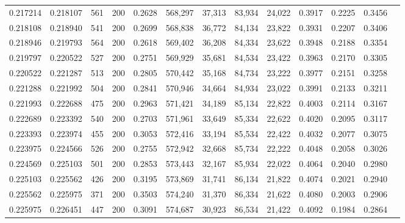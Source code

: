 \begin{tabular}{rrrrrrrrrrrrr}
0.217214 & 0.218107 &    561 & 200 &                                     0.2628 & 568,297 &  37,313 &  83,934 &  24,022 & 0.3917 & 0.2225 & 0.3456 \\
0.218108 & 0.218940 &    541 & 200 &                                     0.2699 & 568,838 &  36,772 &  84,134 &  23,822 & 0.3931 & 0.2207 & 0.3406 \\
0.218946 & 0.219793 &    564 & 200 &                                     0.2618 & 569,402 &  36,208 &  84,334 &  23,622 & 0.3948 & 0.2188 & 0.3354 \\
0.219797 & 0.220522 &    527 & 200 &                                     0.2751 & 569,929 &  35,681 &  84,534 &  23,422 & 0.3963 & 0.2170 & 0.3305 \\
0.220522 & 0.221287 &    513 & 200 &                                     0.2805 & 570,442 &  35,168 &  84,734 &  23,222 & 0.3977 & 0.2151 & 0.3258 \\
0.221288 & 0.221992 &    504 & 200 &                                     0.2841 & 570,946 &  34,664 &  84,934 &  23,022 & 0.3991 & 0.2133 & 0.3211 \\
0.221993 & 0.222688 &    475 & 200 &                                     0.2963 & 571,421 &  34,189 &  85,134 &  22,822 & 0.4003 & 0.2114 & 0.3167 \\
0.222689 & 0.223392 &    540 & 200 &                                     0.2703 & 571,961 &  33,649 &  85,334 &  22,622 & 0.4020 & 0.2095 & 0.3117 \\
0.223393 & 0.223974 &    455 & 200 &                                     0.3053 & 572,416 &  33,194 &  85,534 &  22,422 & 0.4032 & 0.2077 & 0.3075 \\
0.223975 & 0.224566 &    526 & 200 &                                     0.2755 & 572,942 &  32,668 &  85,734 &  22,222 & 0.4048 & 0.2058 & 0.3026 \\
0.224569 & 0.225103 &    501 & 200 &                                     0.2853 & 573,443 &  32,167 &  85,934 &  22,022 & 0.4064 & 0.2040 & 0.2980 \\
0.225103 & 0.225562 &    426 & 200 &                                     0.3195 & 573,869 &  31,741 &  86,134 &  21,822 & 0.4074 & 0.2021 & 0.2940 \\
0.225562 & 0.225975 &    371 & 200 &                                     0.3503 & 574,240 &  31,370 &  86,334 &  21,622 & 0.4080 & 0.2003 & 0.2906 \\
0.225975 & 0.226451 &    447 & 200 &                                     0.3091 & 574,687 &  30,923 &  86,534 &  21,422 & 0.4092 & 0.1984 & 0.2864 \\

\end{tabular}
